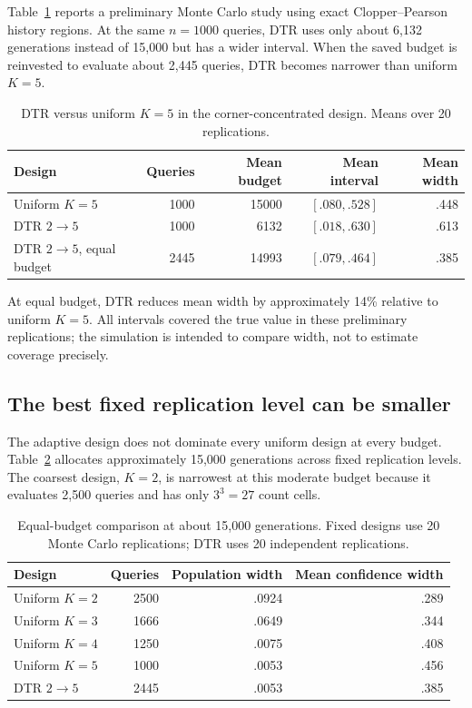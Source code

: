 \documentclass[11pt]{article}
\theoremstyle{remark}
\begin{document}
Table~\ref{tab:adaptive} reports a preliminary Monte Carlo study using exact Clopper--Pearson history regions. At the same $n=1000$ queries, DTR uses only about 6,132 generations instead of 15,000 but has a wider interval. When the saved budget is reinvested to evaluate about 2,445 queries, DTR becomes narrower than uniform $K=5$.

\begin{table}[H]
\centering
\caption{DTR versus uniform $K=5$ in the corner-concentrated design. Means over 20 replications.}
\label{tab:adaptive}
\begin{tabular}{lrrrr}
\toprule
Design & Queries & Mean budget & Mean interval & Mean width\\
\midrule
Uniform $K=5$ & 1000 & 15000 & $[.080,.528]$ & .448\\
DTR $2\to5$ & 1000 & 6132 & $[.018,.630]$ & .613\\
DTR $2\to5$, equal budget & 2445 & 14993 & $[.079,.464]$ & .385\\
\bottomrule
\end{tabular}
\end{table}

At equal budget, DTR reduces mean width by approximately 14\% relative to uniform $K=5$. All intervals covered the true value in these preliminary replications; the simulation is intended to compare width, not to estimate coverage precisely.

\subsection{The best fixed replication level can be smaller}

The adaptive design does not dominate every uniform design at every budget. Table~\ref{tab:fixedbudget} allocates approximately 15,000 generations across fixed replication levels. The coarsest design, $K=2$, is narrowest at this moderate budget because it evaluates 2,500 queries and has only $3^3=27$ count cells.

\begin{table}[H]
\centering
\caption{Equal-budget comparison at about 15,000 generations. Fixed designs use 20 Monte Carlo replications; DTR uses 20 independent replications.}
\label{tab:fixedbudget}
\begin{tabular}{lrrr}
\toprule
Design & Queries & Population width & Mean confidence width\\
\midrule
Uniform $K=2$ & 2500 & .0924 & .289\\
Uniform $K=3$ & 1666 & .0649 & .344\\
Uniform $K=4$ & 1250 & .0075 & .408\\
Uniform $K=5$ & 1000 & .0053 & .456\\
DTR $2\to5$ & 2445 & .0053 & .385\\
\bottomrule
\end{tabular}
\end{table}
\end{document}
